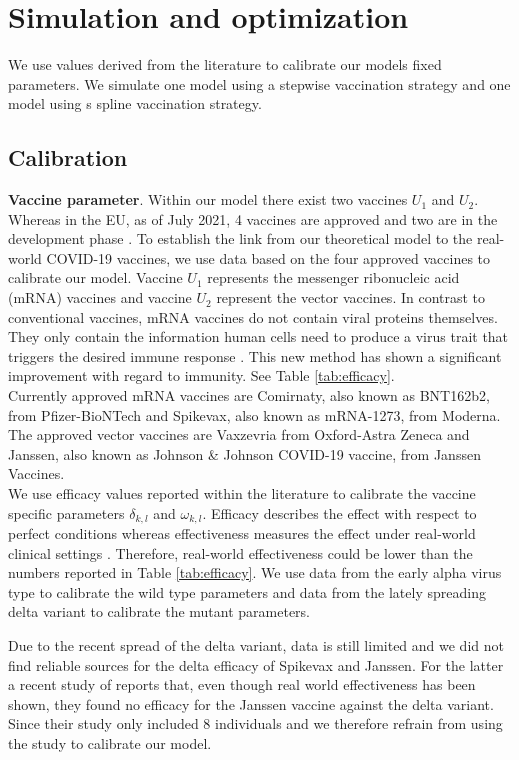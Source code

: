 \section{Simulation and optimization}
We use values derived from the literature to calibrate our models fixed parameters. We simulate one model using a stepwise vaccination strategy and one model using s spline vaccination strategy.


\subsection{Calibration}
\textbf{Vaccine parameter}. Within our model there  exist two vaccines $U_1$ and $U_2$. Whereas in the EU, as of July 2021, 4 vaccines are approved and two are in the development phase \citep{ECa.2021}. To establish the link from our theoretical model to the real-world COVID-19 vaccines, we use data based on the four approved vaccines to calibrate our model. Vaccine $U_1$ represents the messenger ribonucleic acid (mRNA) vaccines and vaccine $U_2$ represent the vector vaccines. In contrast to conventional vaccines, mRNA vaccines do not contain viral proteins themselves. They only contain the information human cells need to produce a virus trait that triggers the desired immune response \citep{Biontech.2021}. This new method has shown a significant improvement with regard to immunity. See Table \ref{tab:efficacy}. \\

Currently approved mRNA vaccines are Comirnaty, also known as BNT162b2, from Pfizer-BioNTech and Spikevax, also known as mRNA-1273, from Moderna. The approved vector vaccines are Vaxzevria from Oxford-Astra Zeneca and Janssen, also known as Johnson \& Johnson COVID-19 vaccine, from Janssen Vaccines. \\
 
We use efficacy values reported within the literature to calibrate the vaccine specific parameters $\delta_{k,l}$ and $\omega_{k,l}$. Efficacy describes the effect with respect to perfect conditions whereas effectiveness measures the effect under real-world clinical settings \citep{Gartlehner.2006}. Therefore, real-world effectiveness could be lower than the numbers reported in Table \ref{tab:efficacy}. 
We use data from the early alpha virus type to calibrate the wild type parameters and data from the lately spreading delta variant to calibrate the mutant parameters. 

Due to the recent spread of the delta variant, data is still limited and we did not find reliable sources for the delta efficacy of Spikevax and Janssen. For the latter a recent study of \cite{Jongeneelen.2021} reports that, even though real world effectiveness has been shown, they found no efficacy for the Janssen vaccine against the delta variant. Since their study only included 8 individuals and we therefore refrain from using the study to calibrate our model. \\

